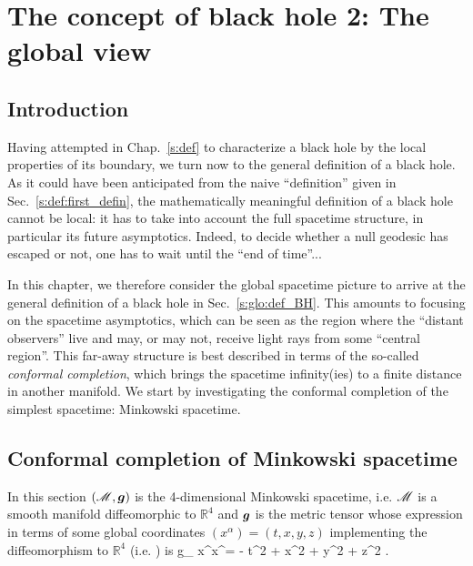 \chapter{The concept of black hole 2: The global view}
\label{s:glo}

\minitoc

\section{Introduction}

Having attempted in Chap.~\ref{s:def} to characterize a black hole by the local
properties of its boundary, we turn now to the general definition of a black
hole. As it could have been anticipated from the naive ``definition'' given
in Sec.~\ref{s:def:first_defin}, the mathematically meaningful definition
of a black hole cannot be local: it has to take into account the full
spacetime structure, in particular its future asymptotics. Indeed, to decide
whether a null geodesic has escaped or not, one has to wait until the ``end
of time''...

In this chapter, we therefore consider the global spacetime picture to
arrive at the general definition of a black hole in
Sec.~\ref{s:glo:def_BH}.
This amounts to focusing on the
spacetime asymptotics, which can be seen as
the region where the ``distant observers'' live and may, or may not, receive
light rays from some ``central region''. This far-away structure is best
described in terms of the so-called \emph{conformal completion}, which brings
the spacetime infinity(ies) to a finite distance in another manifold.
We start by investigating the conformal completion of the simplest
spacetime: Minkowski spacetime.


\section{Conformal completion of Minkowski spacetime}

In this section $(\mathscr{M},\bm{g})$ is the 4-dimensional Minkowski spacetime,
i.e. $\mathscr{M}$ is a smooth manifold diffeomorphic to $\mathbb{R}^4$ and $\bm{g}$
is the metric tensor whose expression in terms of some global coordinates
$(x^\alpha) = (t, x, y, z)$ implementing the diffeomorphism to $\mathbb{R}^4$
(i.e. )
is
\be \label{e:glo:Mink_metric}
    g_{\mu\nu} \D x^\mu \D x^\nu = - \D t^2 + \D x^2 + \D y^2 + \D z^2 .
\ee

